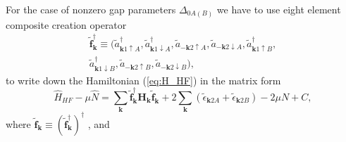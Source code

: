 \documentclass[aps,prb,showpacs,reprint]{revtex4-1}
\begin{document}
For the case of nonzero gap parameters $\Delta_{0 A(B)}$ we have to use eight
element composite creation operator
\begin{equation}
\begin{split}
\mathbf{\tilde{f}}^{\dagger}_{\mathbf{k}}\equiv(\tilde{a}^{\dagger}_{
\mathbf{k}1\uparrow
A},\tilde{a}^{\dagger}_{\mathbf{k}1\downarrow
A},\tilde{a}_{-\mathbf{k}2\uparrow A},\tilde{a}_{-\mathbf{k}2\downarrow
A}, \tilde{a}^{\dagger}_{\mathbf{k}1\uparrow
B},\\
\tilde{a}^{\dagger}_{\mathbf{k}1\downarrow
B},\tilde{a}_{-\mathbf{k}2\uparrow B},\tilde{a}_{-\mathbf{k}2\downarrow
B}),
\nonumber
\end{split}
\end{equation}
to write down the Hamiltonian
(\ref{eq:H_HF}) in the matrix form
\begin{equation}
\hat{H}_{HF}-\mu\hat{N}=\sum_{\mathbf{k}}
\mathbf{\tilde{f}}_{\mathbf{k}}^{\dagger}\mathbf{H}_{\mathbf{k}}
\mathbf{\tilde{f}}_{\mathbf{k}}+2\sum_{\mathbf{k}}(\tilde{\epsilon}_{
\mathbf{k}2 A}+\tilde{\epsilon}_{\mathbf{k}2 B} ) -2\mu N+C,
\label{eq:H_HF_matrixapp}
\end{equation}
where
$\mathbf{\tilde{f}}_{\mathbf{k}}\equiv(\mathbf{\tilde{f}}^{\dagger}_{\mathbf{k}}
)^ { \dagger}$ , and
\end{document}
